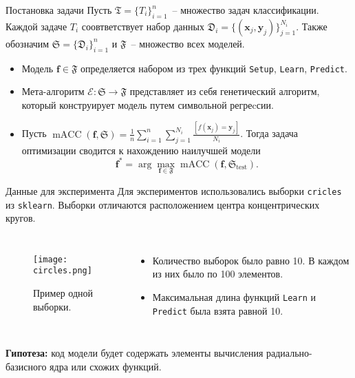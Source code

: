 \documentclass{beamer}
\begin{document}
\begin{frame}{Постановка задачи}
Пусть \(\mathfrak{T} = \{T_i\}_{i=1}^n\)~-- множество задач классификации. Каждой задаче \(T_i\) соовтветствует набор данных \( \mathfrak{D}_i = \{(\mathbf{x}_j, \mathbf{y}_j) \}_{j=1}^{N_i} \). Также обозначим \(\mathfrak{S} = \{ \mathfrak{D}_i\}_{i=1}^n\) и \(\mathfrak{F}\)~-- множество всех моделей.
\begin{itemize}
    \item Модель \(\mathbf{f} \in \mathfrak{F}\) определяется набором из трех функций \texttt{Setup}, \texttt{Learn}, \texttt{Predict}.
    \item Мета-алгоритм \(\mathcal{E}: \mathfrak{S} \rightarrow \mathfrak{F}\) представляет из себя генетический алгоритм, который конструирует модель путем символьной регреcсии. 
    \item Пусть \(
        \operatorname{mACC}(\mathbf{f}, \mathfrak{S}) = \frac{1}{n} \sum_{i=1}^{n} \sum_{j=1}^{N_i} \frac{[f(\mathbf{x}_j) = \mathbf{y}_j]}{N_i}
    \). Тогда задача оптимизации сводится к нахождению наилучшей модели
    \[
        \mathbf{f}^* = \arg \max_{\mathbf{f} \in \mathfrak{F}} \operatorname{mACC}(\mathbf{f}, \mathfrak{S}_{\text{test}}).
    \]
\end{itemize}

\end{frame}
\begin{frame}{Данные для эксперимента}
Для экспериментов использовались выборки \texttt{cricles} из \texttt{sklearn}. Выборки отличаются расположением центра концентрических кругов.

\begin{columns}[c]
\begin{figure}
    \texttt{[image: circles.png]}
    \caption{Пример одной выборки.}
\end{figure}
\begin{itemize}
    \item Количество выборок было равно 10. В каждом из них было по 100 элементов.
    \item Максимальная длина функций \texttt{Learn} и \texttt{Predict} была взята равной 10.
\end{itemize}
\end{columns}
\textbf{Гипотеза:} код модели будет содержать элементы вычисления радиально-базисного ядра или схожих функций.
\end{frame}
\end{document}
